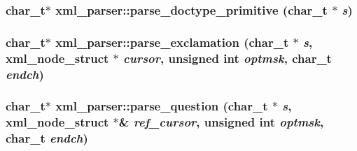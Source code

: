 \label{structxml__parser_a1e996ac9c9993f1939128859596376a1}
\hypertarget{structxml__parser_a722853b603ad9a1d1f61bb8115bea5b4}{
\subsubsection[{parse\_\-doctype\_\-primitive}]{\setlength{\rightskip}{0pt plus 5cm}char\_\-t$\ast$ xml\_\-parser::parse\_\-doctype\_\-primitive (char\_\-t $\ast$ {\em s})}}
\label{structxml__parser_a722853b603ad9a1d1f61bb8115bea5b4}
\hypertarget{structxml__parser_a40da52e4b27a0a06752930a0edf16fe9}{
\subsubsection[{parse\_\-exclamation}]{\setlength{\rightskip}{0pt plus 5cm}char\_\-t$\ast$ xml\_\-parser::parse\_\-exclamation (char\_\-t $\ast$ {\em s}, \/  xml\_\-node\_\-struct $\ast$ {\em cursor}, \/  unsigned int {\em optmsk}, \/  char\_\-t {\em endch})}}
\label{structxml__parser_a40da52e4b27a0a06752930a0edf16fe9}
\hypertarget{structxml__parser_a2b0edc4fbf2ff448b4d5b31593c5c4fd}{
\subsubsection[{parse\_\-question}]{\setlength{\rightskip}{0pt plus 5cm}char\_\-t$\ast$ xml\_\-parser::parse\_\-question (char\_\-t $\ast$ {\em s}, \/  xml\_\-node\_\-struct $\ast$\& {\em ref\_\-cursor}, \/  unsigned int {\em optmsk}, \/  char\_\-t {\em endch})}}
\label{structxml__parser_a2b0edc4fbf2ff448b4d5b31593c5c4fd}


